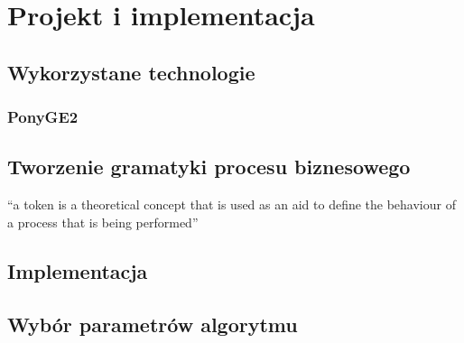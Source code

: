 \chapter{Projekt i implementacja}

\section{Wykorzystane technologie}
\subsection{PonyGE2}

\section{Tworzenie gramatyki procesu biznesowego}

“a token is a theoretical concept that is used as an aid to define the behaviour of a process that is being
performed”
\section{Implementacja}

\section{Wybór parametrów algorytmu}

